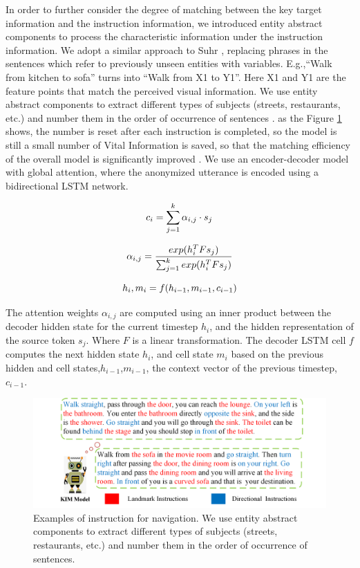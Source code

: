 In order to further consider the degree of matching between the key target information and the instruction information, we introduced entity abstract components to process the characteristic information under the instruction information. We adopt a similar approach to Suhr \cite{suhr2018learning}, replacing phrases in the sentences which refer to previously unseen entities with variables. E.g.,“Walk from kitchen to sofa” turns into “Walk from X1 to Y1”. Here X1 and Y1 are the feature points that match the perceived visual information. We use entity abstract components to extract different types of subjects (streets, restaurants, etc.) and number them in the order of occurrence of sentences \cite{paz2019run}. as the Figure \ref{image05} shows, the number is reset after each instruction is completed, so the model is still a small number of Vital Information is saved, so that the matching efficiency of the overall model is significantly improved \cite{iyer2017learning}. We use an encoder-decoder model with global attention, where the anonymized utterance is encoded using a bidirectional LSTM network.

\begin{equation}
	\centering
	{c}_{i} = \displaystyle\sum_{j=1}^k {\alpha}_{i, j} \cdot s_{j}
\end{equation}

\begin{equation}
	\centering
	{\alpha}_{i, j} = {\frac{exp({h_{i}^{T}Fs_{j}})}{\sum_{j=1}^{k}exp({h_{i}^{T}Fs_{j}})}}
\end{equation}

\begin{equation}
	\centering
	{h}_{i}, {m}_{i} = f({h}_{i-1}, {m}_{i-1}, {c}_{i-1})
\end{equation}

The attention weights ${\alpha}_{i, j}$ are computed using an inner product between the decoder hidden state for the current timestep ${h}_{i}$, and the hidden representation of the source token ${s}_{j}$. Where ${F}$ is a linear transformation. The decoder LSTM cell ${f}$ computes the next hidden state ${h}_{i}$, and cell state ${m}_{i}$ based on the previous hidden and cell states,${h}_{i-1}$,${m}_{i-1}$, the context vector of the previous timestep, ${c}_{i-1}$.

\begin{figure}[h]
	\centering
	\includegraphics[scale=1]{image05.png}
	\caption{Examples of instruction for navigation. We use entity abstract components to extract different types of subjects (streets, restaurants, etc.) and number them in the order of occurrence of sentences.}
	\label{image05}
\end{figure}
\vspace{-2em}
